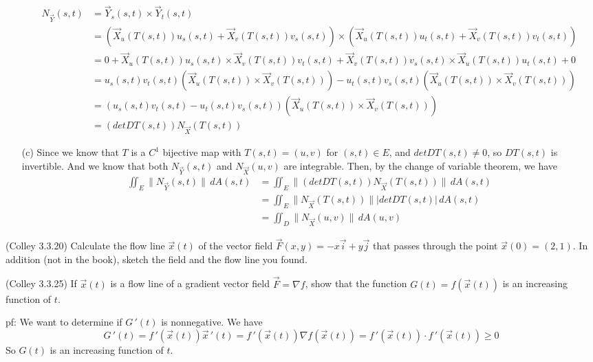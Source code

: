 \documentclass[11pt,letterpaper,cm]{nupset}
\begin{document}
\begin{solution}
\begin{itemize}
\begin{align*}
		N_{\vec{Y}}(s,t)&=\vec{Y}_s(s,t)\times \vec{Y}_t(s,t)\\
		&=(\vec{X}_u(T(s,t))u_s(s,t)+\vec{X}_v(T(s,t))v_s(s,t))\times (\vec{X}_u(T(s,t))u_t(s,t)+\vec{X}_v(T(s,t))v_t(s,t))\\
		&=0+\vec{X}_u(T(s,t))u_s(s,t)\times \vec{X}_v(T(s,t))v_t(s,t)+\vec{X}_v(T(s,t))v_s(s,t)\times \vec{X}_u(T(s,t))u_t(s,t)+0\\
		&=u_s(s,t)v_t(s,t)(\vec{X}_u(T(s,t))\times \vec{X}_v(T(s,t)))-u_t(s,t)v_s(s,t)(\vec{X}_u(T(s,t))\times \vec{X}_v(T(s,t)))\\
		&=(u_s(s,t)v_t(s,t)-u_t(s,t)v_s(s,t))(\vec{X}_u(T(s,t))\times \vec{X}_v(T(s,t)))\\
		&=(detDT(s,t))N_{\vec{X}}(T(s,t))
		\end{align*}
		\item[(c)] Since we know that $T$ is a $C^1$ bijective map with $T(s,t)=(u,v)$ for $(s,t)\in E$, and $detDT(s,t)\neq 0$, so $DT(s,t)$ is invertible. And we know that both $N_{\vec{Y}} (s,t)$ and $N_{\vec{X}} (u,v)$ are integrable. Then, by the change of variable theorem, we have
	\begin{align*}
		\iint_E \|N_{\vec{Y}}(s,t)\|\,dA(s,t)&=\iint_E \|(detDT(s,t))N_{\vec{X}}(T(s,t))\|\,dA(s,t)\\
		&=\iint_E \|N_{\vec{X}}(T(s,t))\||detDT(s,t)|\,dA(s,t)\\
		&=\iint_D \|N_{\vec{X}}(u,v)\|\,dA(u,v)
	\end{align*}
	\end{itemize}
\end{solution}
\newpage

\begin{problem}[Exercise 5] (Colley 3.3.20) Calculate the flow line $\vec{x}(t)$ of the vector field $\vec{F}(x,y)=-x\vec{i}+y\vec{j}$ that passes through the point $\vec{x}(0)=(2,1)$. In addition (not in the book), sketch the field and the flow line you found.
\end{problem}
\begin{solution}
\end{solution}
\newpage

\begin{problem}[Exercise 6] (Colley 3.3.25) If $\vec{x}(t)$ is a flow line of a gradient vector field $\vec{F} = \nabla f$, show that the function $G(t) = f(\vec{x}(t))$ is an increasing function of $t$.
\end{problem}
\begin{solution}
	pf: We want to determine if $G\,'(t)$ is nonnegative. We have
	$$G\,'(t)=f\,'(\vec{x}(t))\vec{x}\,'(t)=f\,'(\vec{x}(t))\nabla f(\vec{x}(t))=f\,'(\vec{x}(t))\cdot f\,'(\vec{x}(t))\geq 0$$
	So $G(t)$ is an increasing function of $t$.
\end{solution}
\newpage
\end{document}

